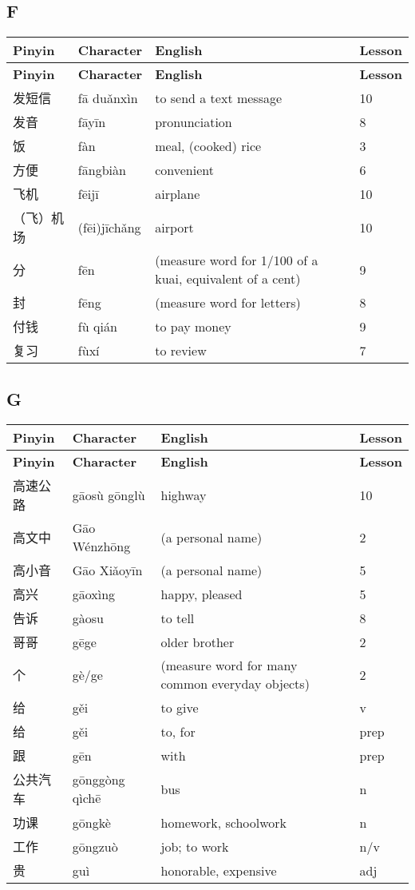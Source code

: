 \documentclass[12pt]{article}
\newcommand{\vocabitem}[4]{%
  #1 & #2 & #3 & #4 \\ \midrule
}
\begin{document}
\subsection*{F}
\begin{longtable}{P{\dimexpr\textwidth/4\relax}P{\dimexpr\textwidth/4\relax}P{\dimexpr\textwidth/4\relax}P{\dimexpr\textwidth/4\relax}}
\toprule
\textbf{Pinyin} & \textbf{Character} & \textbf{English} & \textbf{Lesson} \\
\midrule
\endfirsthead
\toprule
\textbf{Pinyin} & \textbf{Character} & \textbf{English} & \textbf{Lesson} \\
\midrule
\endhead

\vocabitem{发短信}{fā duǎnxìn}{to send a text message}{10}
\vocabitem{发音}{fāyīn}{pronunciation}{8}
\vocabitem{饭}{fàn}{meal, (cooked) rice}{3}
\vocabitem{方便}{fāngbiàn}{convenient}{6}
\vocabitem{飞机}{fēijī}{airplane}{10}
\vocabitem{（飞）机场}{(fēi)jīchǎng}{airport}{10}
\vocabitem{分}{fēn}{(measure word for 1/100 of a kuai, equivalent of a cent)}{9}
\vocabitem{封}{fēng}{(measure word for letters)}{8}
\vocabitem{付钱}{fù qián}{to pay money}{9}
\vocabitem{复习}{fùxí}{to review}{7}
\end{longtable}

\subsection*{G}
\begin{longtable}{P{\dimexpr\textwidth/4\relax}P{\dimexpr\textwidth/4\relax}P{\dimexpr\textwidth/4\relax}P{\dimexpr\textwidth/4\relax}}
\toprule
\textbf{Pinyin} & \textbf{Character} & \textbf{English} & \textbf{Lesson} \\
\midrule
\endfirsthead
\toprule
\textbf{Pinyin} & \textbf{Character} & \textbf{English} & \textbf{Lesson} \\
\midrule
\endhead 
\vocabitem{高速公路}{gāosù gōnglù}{highway}{10}
\vocabitem{高文中}{Gāo Wénzhōng}{(a personal name)}{2}
\vocabitem{高小音}{Gāo Xiǎoyīn}{(a personal name)}{5}
\vocabitem{高兴}{gāoxìng}{happy, pleased}{5}
\vocabitem{告诉}{gàosu}{to tell}{8}
\vocabitem{哥哥}{gēge}{older brother}{2}
\vocabitem{个}{gè/ge}{(measure word for many common everyday objects)}{2}
\vocabitem{给}{gěi}{to give}{v}
\vocabitem{给}{gěi}{to, for}{prep}
\vocabitem{跟}{gēn}{with}{prep}
\vocabitem{公共汽车}{gōnggòng qìchē}{bus}{n}
\vocabitem{功课}{gōngkè}{homework, schoolwork}{n}
\vocabitem{工作}{gōngzuò}{job; to work}{n/v}
\vocabitem{贵}{guì}{honorable, expensive}{adj}
\end{longtable}
\end{document}
